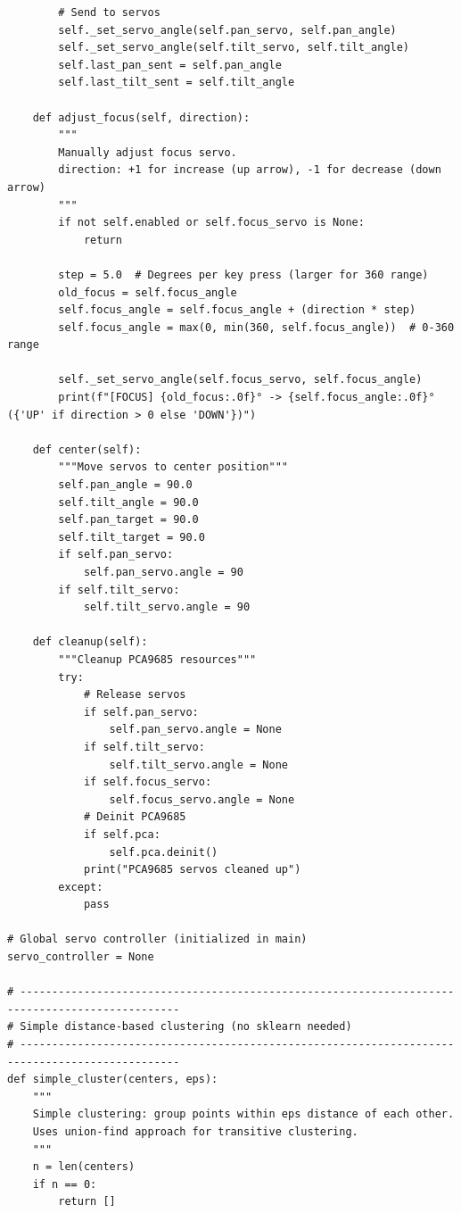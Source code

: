 \documentclass[11pt,a4paper]{article}
\begin{document}
\begin{lstlisting}
        # Send to servos
        self._set_servo_angle(self.pan_servo, self.pan_angle)
        self._set_servo_angle(self.tilt_servo, self.tilt_angle)
        self.last_pan_sent = self.pan_angle
        self.last_tilt_sent = self.tilt_angle
    
    def adjust_focus(self, direction):
        """
        Manually adjust focus servo.
        direction: +1 for increase (up arrow), -1 for decrease (down arrow)
        """
        if not self.enabled or self.focus_servo is None:
            return
        
        step = 5.0  # Degrees per key press (larger for 360 range)
        old_focus = self.focus_angle
        self.focus_angle = self.focus_angle + (direction * step)
        self.focus_angle = max(0, min(360, self.focus_angle))  # 0-360 range
        
        self._set_servo_angle(self.focus_servo, self.focus_angle)
        print(f"[FOCUS] {old_focus:.0f}° -> {self.focus_angle:.0f}° ({'UP' if direction > 0 else 'DOWN'})")
    
    def center(self):
        """Move servos to center position"""
        self.pan_angle = 90.0
        self.tilt_angle = 90.0
        self.pan_target = 90.0
        self.tilt_target = 90.0
        if self.pan_servo:
            self.pan_servo.angle = 90
        if self.tilt_servo:
            self.tilt_servo.angle = 90
    
    def cleanup(self):
        """Cleanup PCA9685 resources"""
        try:
            # Release servos
            if self.pan_servo:
                self.pan_servo.angle = None
            if self.tilt_servo:
                self.tilt_servo.angle = None
            if self.focus_servo:
                self.focus_servo.angle = None
            # Deinit PCA9685
            if self.pca:
                self.pca.deinit()
            print("PCA9685 servos cleaned up")
        except:
            pass

# Global servo controller (initialized in main)
servo_controller = None

# -----------------------------------------------------------------------------------------------
# Simple distance-based clustering (no sklearn needed)
# -----------------------------------------------------------------------------------------------
def simple_cluster(centers, eps):
    """
    Simple clustering: group points within eps distance of each other.
    Uses union-find approach for transitive clustering.
    """
    n = len(centers)
    if n == 0:
        return []
    

\end{lstlisting}
\end{document}
